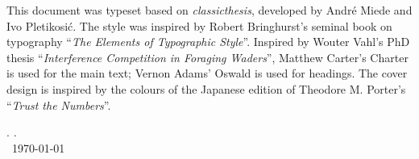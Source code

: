 \thispagestyle{empty}

\hfill

\vfill


\noindent \adftripleflourishright This document was typeset based on \emph{classicthesis}, developed by Andr\'e Miede and Ivo Pletikosić.
The style was inspired by Robert Bringhurst's seminal book on typography ``\emph{The Elements of Typographic Style}''.
Inspired by Wouter Vahl's PhD thesis ``\emph{Interference Competition in Foraging Waders}'', Matthew Carter's Charter is used for the main text; Vernon Adams' Oswald is used for headings.
The cover design is inspired by the colours of the Japanese edition of Theodore M. Porter's ``\emph{Trust the Numbers}''.

\bigskip

\noindent\finalVersionString

\noindent\myName. \textit{\myTitle.}%
\\
\textcopyright\ \today

%
%
%
%
%
